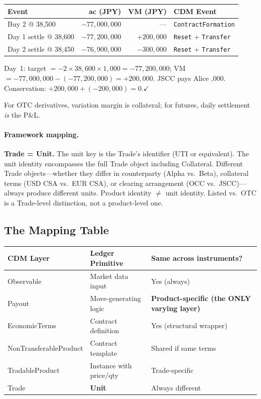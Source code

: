 \documentclass[11pt,a4paper]{article}
\begin{document}
\begin{center}
\small
\begin{tabular}{@{}lrrl@{}}
\toprule
\textbf{Event} & \textbf{ac (JPY)} & \textbf{VM (JPY)} & \textbf{CDM Event} \\
\midrule
Buy 2 @ 38,500 & $-77{,}000{,}000$ & --- & \texttt{ContractFormation} \\
Day 1 settle @ 38,600 & $-77{,}200{,}000$ & $+200{,}000$ & \texttt{Reset} + \texttt{Transfer} \\
Day 2 settle @ 38,450 & $-76{,}900{,}000$ & $-300{,}000$ & \texttt{Reset} + \texttt{Transfer} \\
\bottomrule
\end{tabular}
\end{center}

\noindent Day~1: target $= -2 \times 38{,}600 \times 1{,}000 = -77{,}200{,}000$; VM $= -77{,}000{,}000 - (-77{,}200{,}000) = +200{,}000$. JSCC pays Alice ,000. Conservation: $+200{,}000 + (-200{,}000) = 0$.\quad$\checkmark$

\medskip
\noindent For OTC derivatives, variation margin is collateral; for futures, daily settlement \emph{is} the P\&L.

\paragraph{Framework mapping.} \textbf{Trade = Unit.} The unit key is the Trade's identifier (UTI or equivalent). The unit identity encompasses the full Trade object including Collateral. Different Trade objects---whether they differ in counterparty (Alpha vs.\ Beta), collateral terms (USD CSA vs.\ EUR CSA), or clearing arrangement (OCC vs.\ JSCC)---always produce different units. Product identity $\neq$ unit identity. Listed vs.\ OTC is a Trade-level distinction, not a product-level one.

\subsection{The Mapping Table}
\label{sec:cdm-mapping-table}

\begin{center}
\small
\begin{tabular}{l l l}
\toprule
\textbf{CDM Layer} & \textbf{Ledger Primitive} & \textbf{Same across instruments?} \\
\midrule
Observable & Market data input & Yes (always) \\
Payout & Move-generating logic & \textbf{Product-specific (the ONLY varying layer)} \\
EconomicTerms & Contract definition & Yes (structural wrapper) \\
NonTransferableProduct & Contract template & Shared if same terms \\
TradableProduct & Instance with price/qty & Trade-specific \\
Trade & \textbf{Unit} & Always different \\
\bottomrule
\end{tabular}
\end{center}
\end{document}
